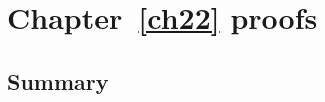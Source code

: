 \chapter{Chapter~\ref{ch22} proofs}

\newpage
\section{Summary}\label{ch22.ps.summary}
\lpscriptsummary
